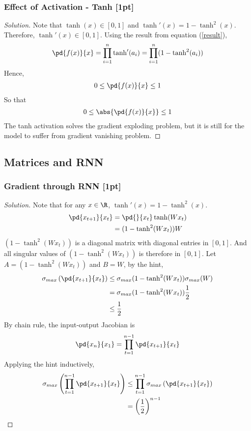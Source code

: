 \documentclass{article}
\begin{document}
	\subsubsection{Effect of Activation - Tanh [1pt]}
	\begin{proof}[Solution]
		Note that $\tanh(x) \in [0, 1]$ and $\tanh'(x) = 1 - \tanh^2(x)$. Therefore, $\tanh'(x) \in [0, 1]$. Using the result from equation (\ref{result}),
		\begin{align}
			\pd{f(x)}{x} = \prod_{i=1}^n \tanh'(a_i) = \prod_{i=1}^n (1 - \tanh^2(a_i))
		\end{align}
		Hence,
		\begin{align}
			0 \leq \pd{f(x)}{x} \leq 1
		\end{align}
		So that
		\begin{align}
			0 \leq \abs{\pd{f(x)}{x}} \leq 1
		\end{align}
		The tanh activation solves the gradient exploding problem, but it is still for the model to suffer from gradient vanishing problem.
	\end{proof}

	\subsection{Matrices and RNN}
	\subsubsection{Gradient through RNN [1pt]}
	\begin{proof}[Solution]
		Note that for any $x \in \R$, $\tanh'(x) = 1 - \tanh^2(x)$.
		\begin{align}
			\pd{x_{t+1}}{x_t} &= \pd{}{x_t} \tanh(W x_t) \\
			&= (1 - \tanh^2(W x_t)) W
		\end{align}
		$(1 - \tanh^2(W x_t))$ is a diagonal matrix with diagonal entries in $[0, 1]$. And all singular values of $(1 - \tanh^2(W x_t))$ is therefore in $[0, 1]$. Let $A = (1 - \tanh^2(W x_t))$ and $B = W$, by the hint,
		\begin{align}
			\sigma_{max}\left(\pd{x_{t+1}}{x_t} \right)
			&\leq \sigma_{max}(1 - \tanh^2(W x_t)) \sigma_{max}(W) \\
			&=\sigma_{max}(1 - \tanh^2(W x_t)) \frac{1}{2} \\
			&\leq \frac{1}{2}
		\end{align}
		By chain rule, the input-output Jacobian is
		\begin{align}
			\pd{x_n}{x_1} = \prod_{t=1}^{n-1} \pd{x_{t+1}}{x_t}
		\end{align}
		Applying the hint inductively,
		\begin{align}
			\sigma_{max} \left(\prod_{t=1}^{n-1} \pd{x_{t+1}}{x_t} \right)
			&\leq \prod_{t=1}^{n-1} \sigma_{max}\left(\pd{x_{t+1}}{x_t}\right) \\
			&=  \left(\frac{1}{2}\right)^{n-1}
		\end{align}
		
	\end{proof}
\end{document}
